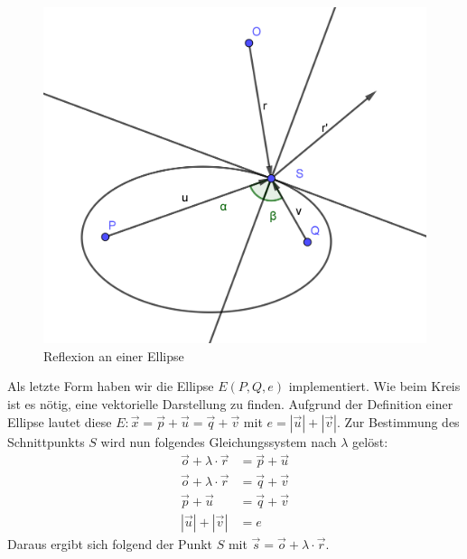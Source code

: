 \documentclass[reducespace,stylepage,semiarbeit]{spezidoc}
\begin{document}
\begin{figure}
\includegraphics[scale=0.7]{pictures/OvalRef.png}
\caption{Reflexion an einer Ellipse}
\end{figure}
Als letzte Form haben wir die Ellipse $E(P, Q, e)$ implementiert.
Wie beim Kreis ist es nötig, eine vektorielle Darstellung zu finden. 
Aufgrund der Definition einer Ellipse lautet diese $E: \vec{x} = \vec{p} + \vec{u} = \vec{q} + \vec{v}$ mit $ e = |\vec{u}| + |\vec{v}|$.
Zur Bestimmung des Schnittpunkts $S$ wird nun folgendes Gleichungssystem nach $\lambda$ gelöst:
\begin{equation*}
\begin{split}
\vec{o} + \lambda \cdot \vec{r} &= \vec{p} + \vec{u} \\
\vec{o} + \lambda \cdot \vec{r} &= \vec{q} + \vec{v} \\
\vec{p} + \vec{u} &= \vec{q} + \vec{v} \\
|\vec{u}| + |\vec{v}| &= e
\end{split}
\end{equation*}
Daraus ergibt sich folgend der Punkt $S$ mit $\vec{s} = \vec{o} + \lambda \cdot \vec{r}$.

\newpage
\end{document}
